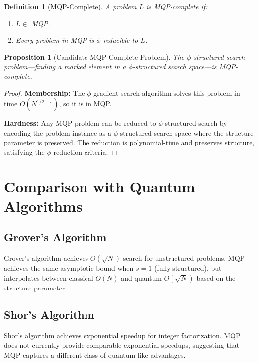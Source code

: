 \documentclass{article}
\newtheorem{definition}{Definition}
\newtheorem{proposition}{Proposition}
\theoremstyle{remark}
\begin{document}
\begin{definition}[MQP-Complete]
A problem $L$ is MQP-complete if:
\begin{enumerate}
\item $L \in$ MQP.
\item Every problem in MQP is $\phi$-reducible to $L$.
\end{enumerate}
\end{definition}

\begin{proposition}[Candidate MQP-Complete Problem]
The $\phi$-structured search problem---finding a marked element in a $\phi$-structured search space---is MQP-complete.
\end{proposition}

\begin{proof}
\textbf{Membership:} The $\phi$-gradient search algorithm solves this problem in time $O(N^{1/2-s})$, so it is in MQP.

\textbf{Hardness:} Any MQP problem can be reduced to $\phi$-structured search by encoding the problem instance as a $\phi$-structured search space where the structure parameter is preserved. The reduction is polynomial-time and preserves structure, satisfying the $\phi$-reduction criteria.
\end{proof}

\section{Comparison with Quantum Algorithms}

\subsection{Grover's Algorithm}

Grover's algorithm achieves $O(\sqrt{N})$ search for unstructured problems. MQP achieves the same asymptotic bound when $s = 1$ (fully structured), but interpolates between classical $O(N)$ and quantum $O(\sqrt{N})$ based on the structure parameter.

\subsection{Shor's Algorithm}

Shor's algorithm achieves exponential speedup for integer factorization. MQP does not currently provide comparable exponential speedups, suggesting that MQP captures a different class of quantum-like advantages.
\end{document}
